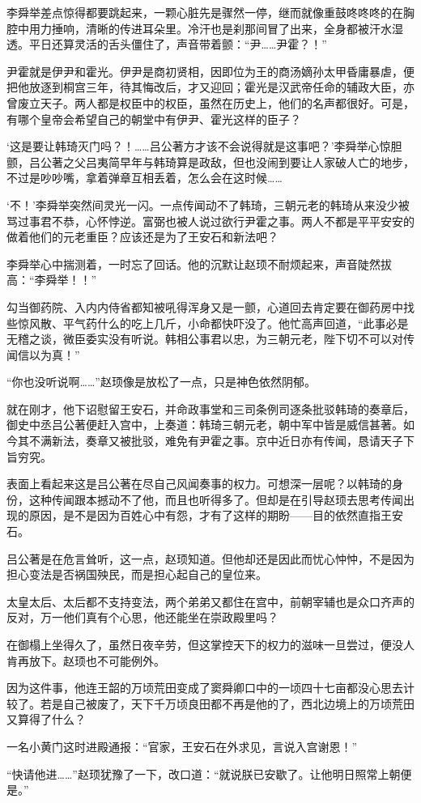 李舜举差点惊得都要跳起来，一颗心脏先是骤然一停，继而就像重鼓咚咚咚的在胸腔中用力捶响，清晰的传进耳朵里。冷汗也是刹那间冒了出来，全身都被汗水湿透。平日还算灵活的舌头僵住了，声音带着颤：“尹……尹霍？！”

尹霍就是伊尹和霍光。伊尹是商初贤相，因即位为王的商汤嫡孙太甲昏庸暴虐，便把他放逐到桐宫三年，待其悔改后，才又迎回；霍光是汉武帝任命的辅政大臣，亦曾废立天子。两人都是权臣中的权臣，虽然在历史上，他们的名声都很好。可是，有哪个皇帝会希望自己的朝堂中有伊尹、霍光这样的臣子？

‘这是要让韩琦灭门吗？！……吕公著方才该不会说得就是这事吧？’李舜举心惊胆颤，吕公著之父吕夷简早年与韩琦算是政敌，但也没闹到要让人家破人亡的地步，不过是吵吵嘴，拿着弹章互相丢着，怎么会在这时候……

‘不！’李舜举突然间灵光一闪。一点传闻动不了韩琦，三朝元老的韩琦从来没少被骂过事君不恭，心怀悖逆。富弼也被人说过欲行尹霍之事。两人不都是平平安安的做着他们的元老重臣？应该还是为了王安石和新法吧？

李舜举心中揣测着，一时忘了回话。他的沉默让赵顼不耐烦起来，声音陡然拔高：“李舜举！！”

勾当御药院、入内内侍省都知被吼得浑身又是一颤，心道回去肯定要在御药房中找些惊风散、平气药什么的吃上几斤，小命都快吓没了。他忙高声回道，“此事必是无稽之谈，微臣委实没有听说。韩相公事君以忠，为三朝元老，陛下切不可以对传闻信以为真！”

“你也没听说啊……”赵顼像是放松了一点，只是神色依然阴郁。

就在刚才，他下诏慰留王安石，并命政事堂和三司条例司逐条批驳韩琦的奏章后，御史中丞吕公著便赶入宫中，上奏道：韩琦三朝元老，朝中军中皆是威信甚著。如今其不满新法，奏章又被批驳，难免有尹霍之事。京中近日亦有传闻，恳请天子下旨穷究。

表面上看起来这是吕公著在尽自己风闻奏事的权力。可想深一层呢？以韩琦的身份，这种传闻跟本撼动不了他，而且也听得多了。但却是在引导赵顼去思考传闻出现的原因，是不是因为百姓心中有怨，才有了这样的期盼——目的依然直指王安石。

吕公著是在危言耸听，这一点，赵顼知道。但他却还是因此而忧心忡忡，不是因为担心变法是否祸国殃民，而是担心起自己的皇位来。

太皇太后、太后都不支持变法，两个弟弟又都住在宫中，前朝宰辅也是众口齐声的反对，万一他们真有个心思，他还能坐在崇政殿里吗？

在御榻上坐得久了，虽然日夜辛劳，但这掌控天下的权力的滋味一旦尝过，便没人肯再放下。赵顼也不可能例外。

因为这件事，他连王韶的万顷荒田变成了窦舜卿口中的一顷四十七亩都没心思去计较了。若是自己被废了，天下千万顷良田都不再是他的了，西北边境上的万顷荒田又算得了什么？

一名小黄门这时进殿通报：“官家，王安石在外求见，言说入宫谢恩！”

“快请他进……”赵顼犹豫了一下，改口道：“就说朕已安歇了。让他明日照常上朝便是。”

